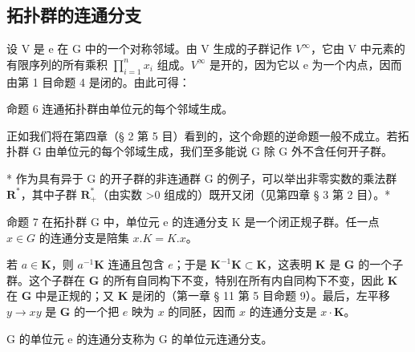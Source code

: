 \subsection{拓扑群的连通分支}

设 V 是 e 在 G 中的一个对称邻域。由 V 生成的子群记作 \(V^{\infty}\)，它由 V 中元素的有限序列的所有乘积 \(\prod_{i=1}^{n} x_{i}\) 组成。\(V^{\infty}\) 是开的，因为它以 e 为一个内点，因而由第 1 目命题 4 是闭的。由此可得：

命题 6 连通拓扑群由单位元的每个邻域生成。

正如我们将在第四章（§ 2 第 5 目）看到的，这个命题的逆命题一般不成立。若拓扑群 G 由单位元的每个邻域生成，我们至多能说 G 除 G 外不含任何开子群。

* 作为具有异于 G 的开子群的非连通群 G 的例子，可以举出非零实数的乘法群 \(\mathbf{R}^{*}\)，其中子群 \(\mathbf{R}_{+}^{*}\)（由实数 \textgreater0 组成的）既开又闭（见第四章 § 3 第 2 目）。*

命题 7 在拓扑群 G 中，单位元 e 的连通分支 K 是一个闭正规子群。任一点 \(x \in G\) 的连通分支是陪集 \(x.K = K.x\)。

若 \(a \in \mathbf{K}\)，则 \(a^{-1}\mathbf{K}\) 连通且包含 \(e\)；于是 \(\mathbf{K}^{-1}\mathbf{K} \subset \mathbf{K}\)，这表明 \(\mathbf{K}\) 是 \(\mathbf{G}\) 的一个子群。这个子群在 \(\mathbf{G}\) 的所有自同构下不变，特别在所有内自同构下不变，因此 \(\mathbf{K}\) 在 \(\mathbf{G}\) 中是正规的；又 \(\mathbf{K}\) 是闭的（第一章 § 11 第 5 目命题 9）。最后，左平移 \(y \to xy\) 是 \(\mathbf{G}\) 的一个把 \(e\) 映为 \(x\) 的同胚，因而 \(x\) 的连通分支是 \(x\cdot \mathbf{K}\)。

G 的单位元 e 的连通分支称为 G 的单位元连通分支。


